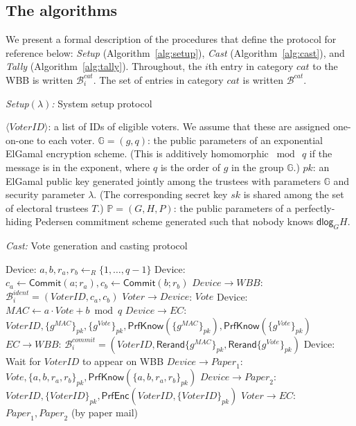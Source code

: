 \documentclass[12pt,a4paper]{article}
\newcommand{\commit}{\mathsf{Commit}}
\newcommand{\PrfEnc}{\mathsf{PrfEnc}}
\newcommand{\PrfKnow}{\mathsf{PrfKnow}}
\newcommand{\rerand}{\mathsf{Rerand}}
\newcommand{\dlog}{\mathsf{dlog}}
\theoremstyle{definition}
\newcommand{\Vote}{\mathit{Vote}}
\newcommand{\VoterID}{\mathit{VoterID}}
\newcommand{\Paper}{\mathit{Paper}}
\newcommand{\Mac}{\mathit{MAC}}
\newcommand{\Wbb}{\mathit{WBB}}
\begin{document}
\subsection{The algorithms}
We present a formal description of the procedures that define the protocol for reference below: \textit{Setup} (Algorithm~\ref{alg:setup}), \textit{Cast} (Algorithm~\ref{alg:cast}), and \textit{Tally} (Algorithm~\ref{alg:tally}). Throughout, the $i$th entry in category $cat$ to the WBB is written $\mathcal{B}^{cat}_i$. The set of entries in category $cat$ is written $\mathcal{B}^{cat}$.
\singlespacing
\begin{algorithm}
    \caption{\textit{Setup}$(\lambda)$\textit{:} System setup protocol}
	\begin{algorithmic}[1]
        \State $\langle \VoterID \rangle$: a list of IDs of eligible voters.  We assume that these are assigned one-on-one to each voter.
        \State $\mathbb{G} = (g, q)$: the public parameters of an exponential ElGamal encryption scheme.
        (This is additively homomorphic $\bmod\ q$ if the message is in the exponent, where $q$ is the order of $g$ in the group $\mathbb{G}$.)
        \State $pk$: an ElGamal public key generated jointly among the trustees with parameters $\mathbb{G}$ and security parameter $\lambda$. (The corresponding secret key $sk$ is shared among the set of electoral trustees $T$.)
        \State$\mathbb{P} = (G,H,P)$: the public parameters of a perfectly-hiding Pedersen commitment scheme generated such that nobody knows $\dlog_G H$.
    \end{algorithmic}
	\label{alg:setup}
\end{algorithm}
\begin{algorithm}
    \caption{\textit{Cast:} Vote generation and casting protocol}
	\begin{algorithmic}[1]
	\State Device: $a,b,r_a,r_b\leftarrow_R\{1,\ldots,q-1\}$
	\State Device: $c_a\leftarrow\commit(a;r_a), c_b\leftarrow\commit(b;r_b)$
	\State $Device\rightarrow \Wbb$: $\mathcal{B}^{ident}_i=(\VoterID, c_a, c_b)$\label{Step:VoterCommit}
	\State $Voter\rightarrow Device$: $\Vote$
	\State Device: $\Mac\leftarrow a\cdot Vote+b\bmod q$
	\State $Device\rightarrow EC$: $\VoterID, \{g^\Mac\}_{pk}, \{g^\Vote\}_{pk}, \PrfKnow(\{g^\Mac\}_{pk}), \PrfKnow(\{g^\Vote\}_{pk})$%
	\State $EC\rightarrow \Wbb$: $\mathcal{B}^{commit}_i=(\VoterID, \rerand\{g^\Mac\}_{pk}, \rerand\{g^\Vote\}_{pk})$ \label{Step:ECPostsVoteMAC}
	\State Device: Wait for $\VoterID$ to appear on WBB
	\State $Device\rightarrow \Paper_1$: $\Vote, \{a,b,r_a,r_b\}_{pk}, \PrfKnow(\{a,b,r_a,r_b\}_{pk})$
	\State $Device\rightarrow \Paper_2$: $\VoterID, \{\VoterID\}_{pk}, \PrfEnc(\VoterID, \{\VoterID\}_{pk})$
	\State $Voter\rightarrow EC$: $\Paper_1, \Paper_2$ (by paper mail)
	\end{algorithmic}
\label{alg:cast}
\end{algorithm}
\end{document}
